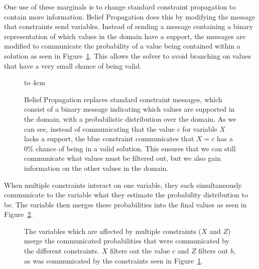 \documentclass[../Document.tex]{subfiles}
\begin{document}
One use of these marginals is to change standard constraint propagation to contain more information. Belief Propagation does this by modifying the message that constraints send variables. Instead of sending a message containing a binary representation of which values in the domain have a support, the messages are modified to communicate the probability of a value being contained within a solution as seen in Figure~\ref{fig:cpbp_messaging}. This allows the solver to avoid branching on values that have a very small chance of being valid.




\begin{figure}[ht]
    \centering
    \vspace{0.5cm}
    \vbox to 4cm {
        
    }
    \caption[\acrlong{cpbp} messaging.]{Belief Propagation replaces standard constraint messages, which consist of a binary message indicating which values are supported in the domain, with a probabilistic distribution over the domain. As we can see, instead of communicating that the value $c$ for variable $X$ lacks a support, the blue constraint communicates that $X=c$ has a $0\%$ chance of being in a valid solution. This ensures that we can still communicate what values must be filtered out, but we also gain information on the other values in the domain.}
    \label{fig:cpbp_messaging}
\end{figure}

When multiple constraints interact on one variable, they each simultaneously communicate to the variable what they estimate the probability distribution to be. The variable then merges these probabilities into the final values as seen in Figure~\ref{fig:cpbp_combined}.



\begin{figure}[ht]
    \centering
    
    \caption[\acrlong{cpbp} combining probabilities]{The variables which are affected by multiple constraints ($X$ and $Z$) merge the communicated probabilities that were communicated by the different constraints. $X$ filters out the value $c$ and $Z$ filters out $b$, as was communicated by the constraints seen in Figure~\ref{fig:cpbp_messaging}.}
    \label{fig:cpbp_combined}
\end{figure}
\end{document}

